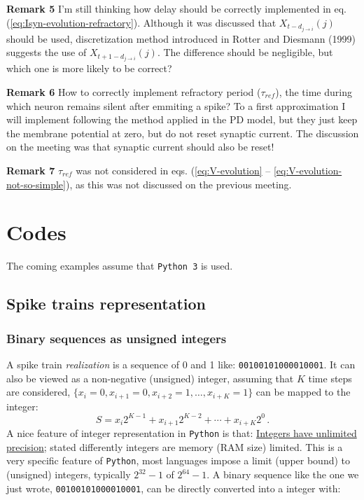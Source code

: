 \documentclass[11pt]{scrartcl}
\begin{document}
\color{red}
\textbf{Remark 5} I'm still thinking how delay should be correctly implemented in eq. (\ref{eq:Isyn-evolution-refractory}). Although it was discussed that \(X_{t-d_{j \to i}}(j)\) should be used, discretization method introduced in Rotter and Diesmann (1999) suggests the use of \(X_{t+1-d_{j \to i}}(j)\). The difference should be negligible, but which one is more likely to be correct?

\textbf{Remark 6} How to correctly implement refractory period (\(\tau_{ref}\)), the time during which  neuron remains silent after emmiting a spike? To a first approximation I will implement following the method applied in the PD model, but they just keep the membrane potential at zero, but do not reset synaptic current. The discussion on the meeting was that synaptic current should also be reset!

\color{black}

\textbf{Remark 7} \(\tau_{ref}\) was not considered in eqs. (\ref{eq:V-evolution} -- \ref{eq:V-evolution-not-so-simple}), as this was not discussed on the previous meeting.

\section{Codes}
\label{sec:org8c29d2c}
The coming examples assume that \texttt{Python 3} is used.

\subsection{Spike trains representation}
\label{sec:org781067f}

\subsubsection{Binary sequences as unsigned integers}
\label{sec:org5b9dd0f}
A spike train \emph{realization} is a sequence of 0 and 1 like: \texttt{00100101000010001}. It can also be viewed as a non-negative (unsigned) integer, assuming that \(K\) time steps are considered, \(\{x_{i}=0,x_{i+1}=0,x_{i+2}=1,\ldots,x_{i+K}=1\}\) can be mapped to the integer: $$S=x_{i} 2^{K-1}+x_{i+1} 2^{K-2} + \cdots + x_{i+K} 2^0\,.$$ A nice feature of integer representation in \texttt{Python} is that: \href{https://docs.python.org/3/library/stdtypes.html\\\#typesnumeric}{Integers have unlimited precision}; stated differently integers are memory (RAM size) limited. This is a very specific feature of \texttt{Python}, most languages impose a limit (upper bound) to (unsigned) integers, typically \(2^{32}-1\)
 of \(2^{64}-1\). A binary sequence like the one we just wrote, \texttt{00100101000010001}, can be directly converted into a integer with:
\end{document}
